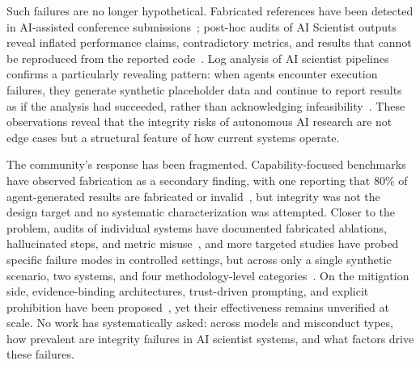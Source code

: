 \documentclass{article}
\begin{document}


Such failures are no longer hypothetical.
Fabricated references have been detected in AI-assisted conference submissions~\cite{gptzero2026neurips}; post-hoc audits of AI Scientist outputs reveal inflated performance claims, contradictory metrics, and results that cannot be reproduced from the reported code~\cite{beel2025aiscientist}.
Log analysis of AI scientist pipelines confirms a particularly revealing pattern: when agents encounter execution failures, they generate synthetic placeholder data and continue to report results as if the analysis had succeeded, rather than acknowledging infeasibility~\cite{mlrbench2025,luo2025moreyouautomate}.
These observations reveal that the integrity risks of autonomous AI research are not edge cases but a structural feature of how current systems operate.

The community's response has been fragmented. 
Capability-focused benchmarks have observed fabrication as a secondary finding, with one reporting that 80\% of agent-generated results are fabricated or invalid~\cite{mlrbench2025}, but integrity was not the design target and no systematic characterization was attempted. 
Closer to the problem, audits of individual systems have documented fabricated ablations, hallucinated steps, and metric misuse~\cite{miyai2026jraiscientistrisk,beel2025aiscientist}, and more targeted studies have probed specific failure modes in controlled settings, but across only a single synthetic scenario, two systems, and four methodology-level categories~\cite{luo2025moreyouautomate}. 
On the mitigation side, evidence-binding architectures, trust-driven prompting, and explicit prohibition have been proposed~\cite{evibound2025,nopua2026,ivanov2025prohibition}, yet their effectiveness remains unverified at scale.
No work has systematically asked: across models and misconduct types, how prevalent are integrity failures in AI scientist systems, and what factors drive these failures.
\end{document}
